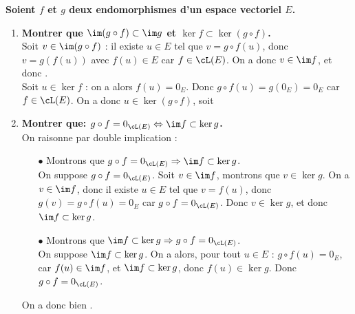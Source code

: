 \documentclass[a4paper, 11pt,reqno]{article}
\begin{document}
\begin{correction}  \;
	\textbf{Soient $f$ et $g$ deux endomorphismes d'un espace vectoriel $E$.}
	\begin{enumerate}
		\item \textbf{Montrer que $\im (g\circ f)\subset \im g$ et $\ker f\subset \ker (g\circ f)$.}\\
		      Soit $v\in \im (g\circ f)$ : il existe $u \in E$ tel que $v=g\circ f (u)$, donc $v= g(f(u))$ avec $f(u) \in E$ car $f \in \cL(E)$. On a donc $v \in \im f$, et donc .\\
		      Soit $u \in \ker f$ : on a alors $f(u)=0_{E}$. Donc $g \circ f(u) = g(0_{E})=0_E$ car $f \in \cL(E)$. On a donc $u \in \ker (g \circ f)$, soit 
		\item \textbf{Montrer que: $g\circ f=0_{\cL (E)}\Leftrightarrow \im f \subset \ker g$.}\\
		      On raisonne par double implication :
		      \begin{itemize}
			      \item[$\bullet$] Montrons que $g\circ f=0_{\cL (E)} \Rightarrow \im f \subset \ker g$.\\
			            On suppose $g\circ f=0_{\cL (E)}$. Soit $v \in \im f$, montrons que $v \in \ker g$. On a $v \in \im f$, donc il existe $u\in E$ tel que $v=f(u)$, donc $g(v)=g\circ f(u) = 0_E$ car $g\circ f=0_{\cL (E)}$. Donc $v \in \ker g$, et donc $\im f \subset \ker g$.
			      \item[$\bullet$] Montrons que $\im f \subset \ker g \Rightarrow g\circ f=0_{\cL (E)}$.\\
			            On suppose $\im f \subset \ker g$. On a alors, pour tout $u \in E$ : $g\circ f(u) =0_E$, car $f(u) \in \im f$, et $\im f \subset \ker g$, donc $f(u) \in \ker g$. Donc $g\circ f=0_{\cL (E)}$.
		      \end{itemize}
		      On a donc bien .
	\end{enumerate}
\end{correction}
\end{document}
